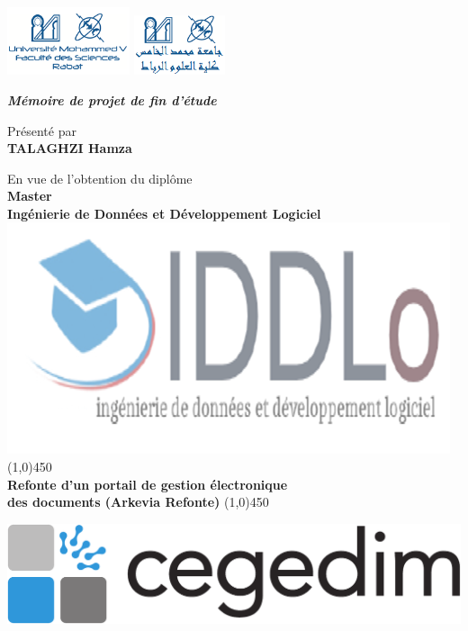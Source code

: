 {
    \vspace*{-1in}
    \includegraphics[width=0.27\textwidth]{images/cover/fsr-fr.png}
    \hfill
    \includegraphics[width=0.2\textwidth]{images/cover/fsr-ar.png}
}
\vspace*{0.5in}
\begin{center}
    \thispagestyle{empty}
    \emph{\Large\textbf{Mémoire de projet de fin d’étude}}\\
    \vspace*{0.4cm}

    {\normalsize Présenté par}\\
    \Large\textbf{TALAGHZI Hamza}\\

    \vspace*{0.5cm}

    \normalsize

    En vue de l’obtention du diplôme\\

    \textbf{Master}\\
    \large
    \textbf{Ingénierie de Données et Développement Logiciel}\\
    \includegraphics[width=0.21\linewidth]{images/cover/iddl.png}
    \line(1,0){450}\\\vspace*{0.5cm}
    \noindent \Large \textbf{Refonte d’un portail de gestion électronique \\des documents (Arkevia Refonte)}
    \line(1,0){450}\\
    
    \vspace*{0.5cm}
    
    \includegraphics[width=0.31\linewidth]{images/sec1/cegedim-logo.pdf}
    

\end{center}
